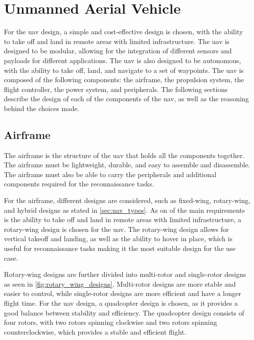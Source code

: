 \section{Unmanned Aerial Vehicle}\label{sec:design_uav}

For the \gls{uav} design, a simple and cost-effective design is chosen, with the ability to take off and land in remote areas with limited infrastructure. The \gls{uav} is designed to be modular, allowing for the integration of different sensors and payloads for different applications. The \gls{uav} is also designed to be autonomous, with the ability to take off, land, and navigate to a set of waypoints. The \gls{uav} is composed of the following components: the airframe, the propulsion system, the flight controller, the power system, and peripherals. The following sections describe the design of each of the components of the \gls{uav}, as well as the reasoning behind the choices made.

\subsection{Airframe}\label{subsec:design_airframe}

The airframe is the structure of the \gls{uav} that holds all the components together. The airframe must be lightweight, durable, and easy to assemble and disassemble. The airframe must also be able to carry the peripherals and additional components required for the reconnaissance tasks.

For the airframe, different designs are considered, such as fixed-wing, rotary-wing, and hybrid designs as stated in \cref{sec:uav_types}. As on of the main requirements is the ability to take off and land in remote areas with limited infrastructure, a rotary-wing design is chosen for the \gls{uav}. The rotary-wing design allows for vertical takeoff and landing, as well as the ability to hover in place, which is useful for reconnaissance tasks making it the most suitable design for the use case.

Rotary-wing designs are further divided into multi-rotor and single-rotor designs as seen in \cref{fig:rotary_wing_designs}. Multi-rotor designs are more stable and easier to control, while single-rotor designs are more efficient and have a longer flight time. For the \gls{uav} design, a quadcopter design is chosen, as it provides a good balance between stability and efficiency. The quadcopter design consists of four rotors, with two rotors spinning clockwise and two rotors spinning counterclockwise, which provides a stable and efficient flight.

